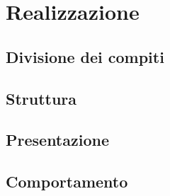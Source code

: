 \section{Realizzazione}

\subsection{Divisione dei compiti}

\subsection{Struttura}

\subsection{Presentazione}

\subsection{Comportamento}